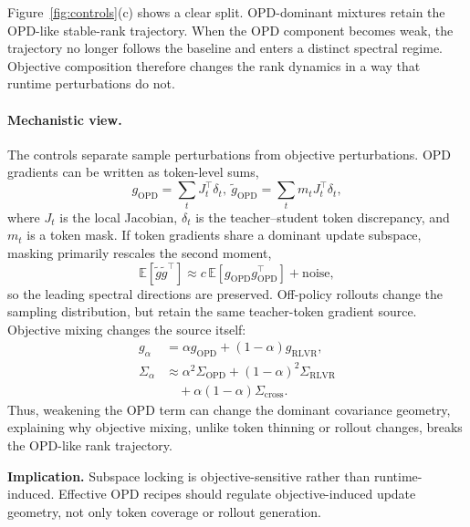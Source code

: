 Figure~\ref{fig:controls}(c) shows a clear split. OPD-dominant mixtures
retain the OPD-like stable-rank trajectory. When the OPD component becomes
weak, the trajectory no longer follows the baseline and enters a distinct
spectral regime. Objective composition therefore changes the rank dynamics
in a way that runtime perturbations do not.

\paragraph{Mechanistic view.}
The controls separate sample perturbations from objective perturbations.
OPD gradients can be written as token-level sums,
\begin{equation}
    g_{\mathrm{OPD}}=\sum_t J_t^\top \delta_t , \
    \tilde g_{\mathrm{OPD}}=\sum_t m_t J_t^\top \delta_t ,
\end{equation}
where $J_t$ is the local Jacobian, $\delta_t$ is the teacher--student
token discrepancy, and $m_t$ is a token mask. If token gradients share a
dominant update subspace, masking primarily rescales the second moment,
\begin{equation}
    \mathbb{E}[\tilde g \tilde g^\top]
    \approx
    c\,\mathbb{E}[g_{\mathrm{OPD}}g_{\mathrm{OPD}}^\top]+\mathrm{noise},
\end{equation}
so the leading spectral directions are preserved. Off-policy rollouts
change the sampling distribution, but retain the same teacher-token
gradient source. Objective mixing changes the source itself:
\begin{equation}
\begin{split}
    g_\alpha
    &=
    \alpha g_{\mathrm{OPD}}
    +(1-\alpha)g_{\mathrm{RLVR}}, \\
    \Sigma_\alpha
    &\approx
    \alpha^2\Sigma_{\mathrm{OPD}}
    +(1-\alpha)^2\Sigma_{\mathrm{RLVR}} \\
    &\quad
    +\alpha(1-\alpha)\Sigma_{\mathrm{cross}} .
\end{split}
\end{equation}
Thus, weakening the OPD term can change the dominant covariance geometry,
explaining why objective mixing, unlike token thinning or rollout changes,
breaks the OPD-like rank trajectory.

\begin{takeawaybox}
\textbf{Implication.}
Subspace locking is objective-sensitive rather than runtime-induced.
Effective OPD recipes should regulate objective-induced update geometry,
not only token coverage or rollout generation.
\end{takeawaybox}